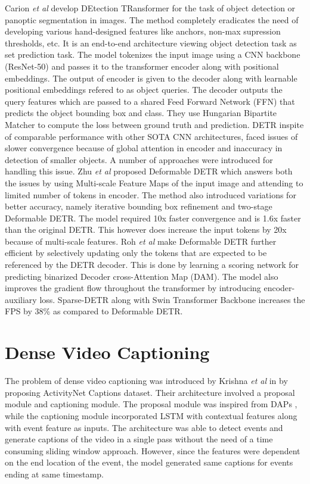 \par Carion \textit{et al} \cite{DETR} develop DEtection TRansformer for the task of object detection or panoptic segmentation in images. The method completely eradicates the need of developing various hand-designed features like anchors, non-max supression thresholds, etc. It is an end-to-end architecture viewing object detection task as set prediction task. The model tokenizes the input image using a CNN backbone (ResNet-50) and passes it to the transformer encoder along with positional embeddings. The output of encoder is given to the decoder along with learnable positional embeddings refered to as object queries. The decoder outputs the query features which are passed to a shared Feed Forward Network (FFN) that predicts the object bounding box and class. They use Hungarian Bipartite Matcher to compute the loss between ground truth and prediction. DETR inspite of comparable performance with other SOTA CNN architectures, faced issues of slower convergence because of global attention in encoder and inaccuracy in detection of smaller objects. A number of approaches were introduced for handling this issue. Zhu \textit{et al} \cite{Deformable Detr} proposed Deformable DETR which answers both the issues by using Multi-scale Feature Maps of the input image and attending to limited number of tokens in encoder. The method also introduced variations for better accuracy, namely iterative bounding box refinement and two-stage Deformable DETR. The model required 10x faster convergence and is 1.6x faster than the original DETR. This however does increase the input tokens by 20x because of multi-scale features. Roh \textit{et al} \cite{Sparse Detr} make Deformable DETR further efficient by selectively updating only the tokens that are expected to be referenced by the DETR decoder. This is done by learning a scoring network for predicting binarized Decoder cross-Attention Map (DAM). The model also improves the gradient flow throughout the transformer by introducing encoder-auxiliary loss. Sparse-DETR along with Swin Transformer Backbone increases the FPS by 38\% as compared to Deformable DETR.


\section{Dense Video Captioning}
\par The problem of dense video captioning was introduced by Krishna \textit{et al} in \cite{krishna2017densecaptioning} by proposing ActivityNet Captions dataset. Their architecture involved a proposal module and captioning module. The proposal module was inspired from DAPs \cite{Escorcia2016DAPsDA}, while the captioning module incorporated LSTM with contextual features along with event feature as inputs. The architecture was able to detect events and generate captions of the video in a single pass without the need of a time consuming sliding window approach.  However, since the features were dependent on the end location of the event, the model generated same captions for events ending at same timestamp.

